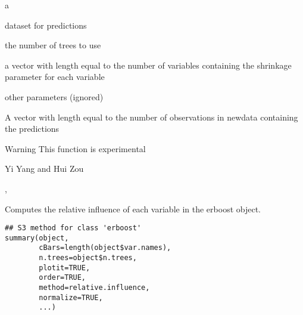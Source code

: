 \documentclass[a4paper]{book}
\begin{document}
%
\begin{Arguments}
\begin{ldescription}
\item[\code{object}]  a  
\item[\code{newdata}]  dataset for predictions 
\item[\code{n.trees}]  the number of trees to use 
\item[\code{lambda}]  a vector with length equal to the number of variables containing the shrinkage parameter for each variable 
\item[\code{...}]  other parameters (ignored) 
\end{ldescription}
\end{Arguments}
%
\begin{Value}
A vector with length equal to the number of observations in newdata containing the predictions
\end{Value}
%
\begin{Section}{Warning}
This function is experimental
\end{Section}
%
\begin{Author}\relax
 Yi Yang  and Hui Zou  
\end{Author}
%
\begin{SeeAlso}\relax
 ,  
\end{SeeAlso}
%
\begin{Description}\relax
Computes the relative influence of each variable in the erboost object.
\end{Description}
%
\begin{Usage}
\begin{verbatim}
## S3 method for class 'erboost'
summary(object,
        cBars=length(object$var.names),
        n.trees=object$n.trees,
        plotit=TRUE,
        order=TRUE,
        method=relative.influence,
        normalize=TRUE,
        ...)
\end{verbatim}
\end{Usage}
%
\end{document}
